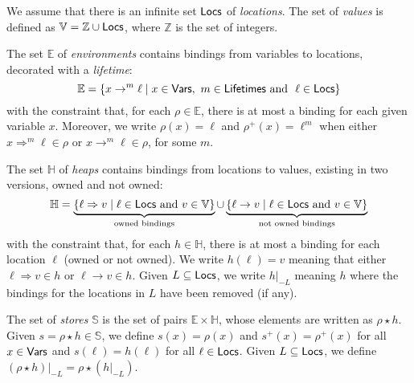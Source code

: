 \begin{definition}
  We assume that there is an infinite set $\mathsf{Locs}$ of \emph{locations}.
  The set of \emph{values} is defined as $\mathbb{V}=\mathbb{Z}\cup\mathsf{Locs}$,
  where $\mathbb{Z}$ is the set of integers.

  The set $\mathbb{E}$
  of \emph{environments} contains bindings from variables to locations,
  decorated with a \emph{lifetime}:
  \[
  \mathbb{E}=\{x\to^m\ell\mid x\in\mathsf{Vars},\ m\in\mathsf{Lifetimes}\text{ and }\ \ell\in\mathsf{Locs}\}
  \]
  with the constraint that, for each $\rho\in\mathbb{E}$, there is at most a binding for each
  given variable $x$. %
  Moreover, we write $\rho(x)=\ell$ and
  $\rho^+(x)=\ell^m$ when
  either $x\Rightarrow^m\ell\in\rho$ or $x\rightarrow^m\ell\in\rho$, for some $m$.

  The set $\mathbb{H}$ of \emph{heaps} contains bindings from locations to values,
  existing in two versions, owned and not owned:
  \[
  \mathbb{H}=
  \underbrace{\{\ell\Rightarrow v\mid\ell\in\mathsf{Locs}\text{ and }v\in\mathbb{V}\}}_{\text{owned bindings}}
  \cup
  \underbrace{\{\ell\rightarrow v\mid\ell\in\mathsf{Locs}\text{ and }v\in\mathbb{V}\}}_{\text{not owned bindings}}
  \]
  with the constraint that, for each $h\in\mathbb{H}$, there is at most a binding for each
  location $\ell$ (owned or not owned). We write $h(\ell)=v$ meaning that
  either $\ell\Rightarrow v\in h$ or $\ell\rightarrow v\in h$. Given $L\subseteq\mathsf{Locs}$,
  we write $h|_{-L}$ meaning $h$ where the bindings for the locations in $L$
  have been removed (if any).

  The set of \emph{stores} $\mathbb{S}$ is the set of pairs
  $\mathbb{E}\times\mathbb{H}$, whose elements are written as $\rho\star h$.
  Given $s=\rho\star h\in\mathbb{S}$, we define $s(x)=\rho(x)$
  and $s^+(x)=\rho^+(x)$ for all
  $x\in\mathsf{Vars}$ and $s(\ell)=h(\ell)$ for all $\ell\in\mathsf{Locs}$.
  Given $L\subseteq\mathsf{Locs}$, we define $(\rho\star h)|_{-L}=\rho\star(h|_{-L})$.
\end{definition}

